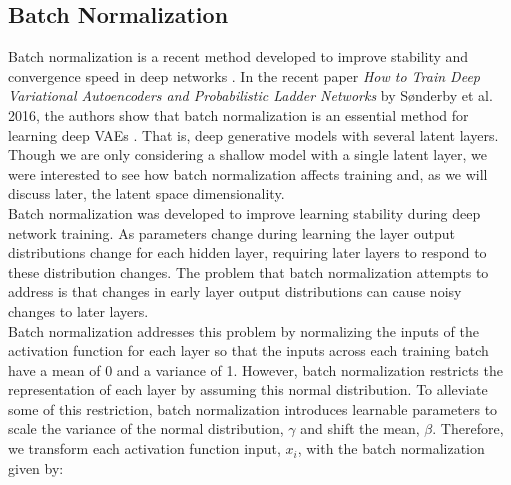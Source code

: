 \documentclass{article} %
\begin{document}



\subsection{Batch Normalization}

Batch normalization is a recent method developed to improve stability and convergence speed in deep networks \cite{Ioffe2015}. In the recent paper \textit{How to Train Deep Variational Autoencoders and Probabilistic Ladder Networks} by S\o nderby et al. 2016, the authors show that batch normalization is an essential method for learning deep VAEs \cite{Sonderby2016}. That is, deep generative models with several latent layers. Though we are only considering a shallow model with a single latent layer, we were interested to see how batch normalization affects training and, as we will discuss later, the latent space dimensionality.\\
Batch normalization was developed to improve learning stability during deep network training. As parameters change during learning the layer output distributions change for each hidden layer, requiring later layers to respond to these distribution changes. The problem that batch normalization attempts to address is that changes in early layer output distributions can cause noisy changes to later layers.\\
Batch normalization addresses this problem by normalizing the inputs of the activation function for each layer so that the inputs across each training batch have a mean of 0 and a variance of 1. However, batch normalization restricts the representation of each layer by assuming this normal distribution. To alleviate some of this restriction, batch normalization introduces learnable parameters to scale the variance of the normal distribution, $\gamma$ and shift the mean, $\beta$. Therefore, we transform each activation function input, $x_i$, with the batch normalization given by:
\end{document}
